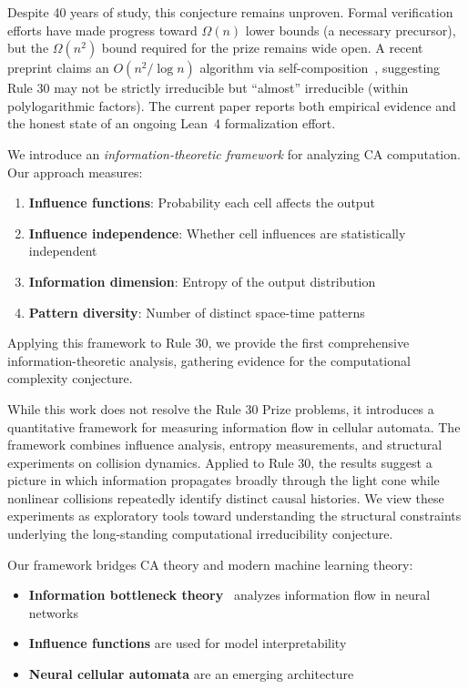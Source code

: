 \documentclass[11pt]{article}
\begin{document}
Despite 40 years of study, this conjecture remains unproven. Formal verification efforts have made progress toward $\Omega(n)$ lower bounds (a necessary precursor), but the $\Omega(n^2)$ bound required for the prize remains wide open. A recent preprint claims an $O(n^2 / \log n)$ algorithm via self-composition~\citep{natal_2024}, suggesting Rule 30 may not be strictly irreducible but ``almost'' irreducible (within polylogarithmic factors). The current paper reports both empirical evidence and the honest state of an ongoing Lean~4 formalization effort.

We introduce an \emph{information-theoretic framework} for analyzing CA computation. Our approach measures:
\begin{enumerate}
    \item \textbf{Influence functions}: Probability each cell affects the output
    \item \textbf{Influence independence}: Whether cell influences are statistically independent
    \item \textbf{Information dimension}: Entropy of the output distribution
    \item \textbf{Pattern diversity}: Number of distinct space-time patterns
\end{enumerate}

Applying this framework to Rule 30, we provide the first comprehensive information-theoretic analysis, gathering evidence for the computational complexity conjecture.

While this work does not resolve the Rule 30 Prize problems, it introduces a quantitative framework for measuring information flow in cellular automata. The framework combines influence analysis, entropy measurements, and structural experiments on collision dynamics. Applied to Rule 30, the results suggest a picture in which information propagates broadly through the light cone while nonlinear collisions repeatedly identify distinct causal histories. We view these experiments as exploratory tools toward understanding the structural constraints underlying the long-standing computational irreducibility conjecture.

Our framework bridges CA theory and modern machine learning theory:
\begin{itemize}
    \item \textbf{Information bottleneck theory}~\citep{tishby_2015} analyzes information flow in neural networks
    \item \textbf{Influence functions} are used for model interpretability~\citep{koh_2017}
    \item \textbf{Neural cellular automata} are an emerging architecture~\citep{mordvintsev_2020}
\end{itemize}
\end{document}
